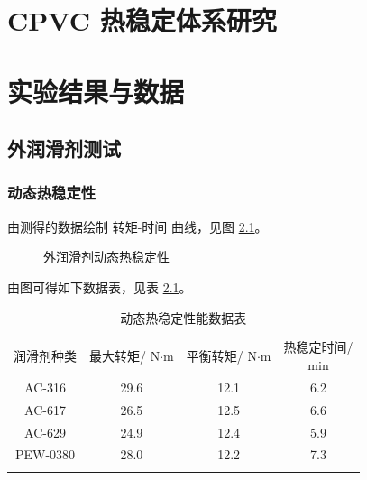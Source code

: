 \documentclass[a4paper, oneside, onecolumn, 12pt]{ctexrep}    %
\begin{document}
\chapter{CPVC 热稳定体系研究}


\chapter{实验结果与数据}

\section{外润滑剂测试}

\subsection{动态热稳定性}
由测得的数据绘制 转矩-时间 曲线，见图 \ref{fig1hakee}。

\begin{figure}[H]
    \begin{center}
        
    \end{center}
    \caption{外润滑剂动态热稳定性}
    \label{fig1hakee}
\end{figure}

由图可得如下数据表，见表 \ref{tab1hakee}。

\begin{table}[htbp]
    \caption{动态热稳定性能数据表}
    \label{tab1hakee}
    \begin{center}
    \footnotesize{
        \begin{tabular}{cccc}
            \Xhline{1pt}
            润滑剂种类 & \makecell[c]{最大转矩/\\N$\cdot$m} & \makecell[c]{平衡转矩/\\N$\cdot$m} & \makecell[c]{热稳定时间/\\min} \\
            \Xhline{0.5pt}
            AC-316 & 29.6 & 12.1 & 6.2  \\
            AC-617 & 26.5 & 12.5 & 6.6  \\
            AC-629 & 24.9 & 12.4 & 5.9  \\
            PEW-0380 & 28.0 & 12.2 & 7.3    \\
            \Xhline{1pt}
        \end{tabular}
    }
    \end{center}
\end{table}
\end{document}
